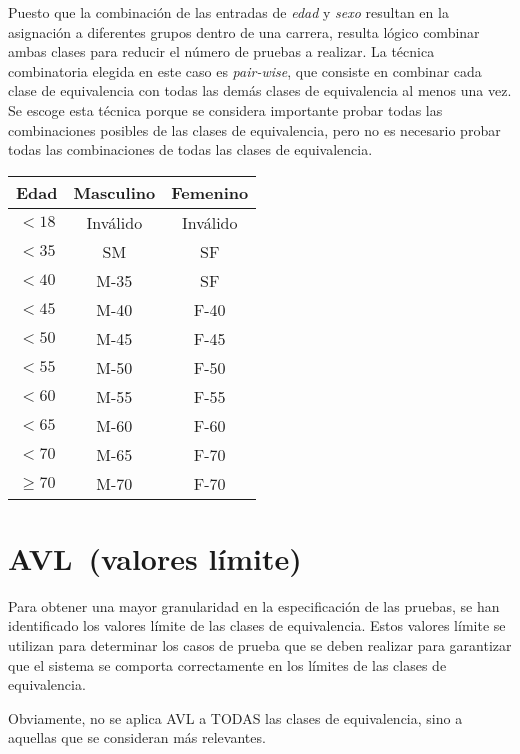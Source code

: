 Puesto que la combinación de las entradas de \textit{edad} y \textit{sexo} resultan en la
asignación a diferentes grupos dentro de una carrera, resulta lógico combinar ambas clases
para reducir el número de pruebas a realizar. La técnica combinatoria elegida en este caso
es \textit{pair-wise}, que consiste en combinar cada clase de equivalencia con todas las demás
clases de equivalencia al menos una vez. Se escoge esta técnica porque se considera importante
probar todas las combinaciones posibles de las clases de equivalencia, pero no es necesario
probar todas las combinaciones de todas las clases de equivalencia.

\begin{table}[ht]
	\centering
	\begin{tabular}{|c|c|c|}
		\hline
		\textbf{Edad} & \textbf{Masculino} & \textbf{Femenino} \\
		\hline
		\hline
		$<18$ & Inválido \cellcolor{red!25} & Inválido \cellcolor{red!25} \\
		$<35$ & SM & SF \\
		$<40$ & M-35 & SF \\
		$<45$ & M-40 & F-40 \\
		$<50$ & M-45 & F-45 \\
		$<55$ & M-50 & F-50 \\
		$<60$ & M-55 & F-55 \\
		$<65$ & M-60 & F-60 \\
		$<70$ & M-65 & F-70 \\
		$\geq 70$ & M-70 & F-70 \\
		\hline
	\end{tabular}
\end{table}

\section{AVL~(valores límite)}
Para obtener una mayor granularidad en la especificación de las pruebas, se han identificado
los valores límite de las clases de equivalencia. Estos valores límite se utilizan para
determinar los casos de prueba que se deben realizar para garantizar que el sistema se
comporta correctamente en los límites de las clases de equivalencia.

Obviamente, no se aplica AVL a TODAS las clases de equivalencia, sino a aquellas que se
consideran más relevantes.

